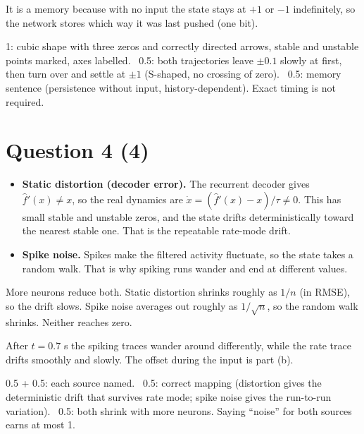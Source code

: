 \documentclass[11pt,letterpaper]{article}
\newcommand{\tin}{\tau_{\mathrm{in}}}
\newcommand{\ans}[1]{\par\vspace{4pt}{\bfseries #1}\quad}
\begin{document}
It is a memory because with no input the state stays at $+1$ or $-1$ indefinitely, so the network stores which way it was last pushed (one bit).
\begin{marking}
1: cubic shape with three zeros and correctly directed arrows, stable and unstable points marked, axes labelled. \ 0.5: both trajectories leave $\pm0.1$ slowly at first, then turn over and settle at $\pm1$ (S-shaped, no crossing of zero). \ 0.5: memory sentence (persistence without input, history-dependent). Exact timing is not required.
\end{marking}

\section*{Question 4 \hfill (4)}

\ans{(a) [2]}
\begin{itemize}[leftmargin=1.2em]
\item \textbf{Static distortion (decoder error).} The recurrent decoder gives $\hat f'(x) \ne x$, so the real dynamics are $\dot x = (\hat f'(x) - x)/\tau \ne 0$. This has small stable and unstable zeros, and the state drifts deterministically toward the nearest stable one. That is the repeatable rate-mode drift.
\item \textbf{Spike noise.} Spikes make the filtered activity fluctuate, so the state takes a random walk. That is why spiking runs wander and end at different values.
\end{itemize}
More neurons reduce both. Static distortion shrinks roughly as $1/n$ (in RMSE), so the drift slows. Spike noise averages out roughly as $1/\sqrt n$, so the random walk shrinks. Neither reaches zero.
\begin{center}
\end{center}
After $t = 0.7$ s the spiking traces wander around differently, while the rate trace drifts smoothly and slowly. The offset during the input is part (b).
\begin{marking}
0.5 + 0.5: each source named. \ 0.5: correct mapping (distortion gives the deterministic drift that survives rate mode; spike noise gives the run-to-run variation). \ 0.5: both shrink with more neurons. Saying ``noise'' for both sources earns at most 1.
\end{marking}
\end{document}
